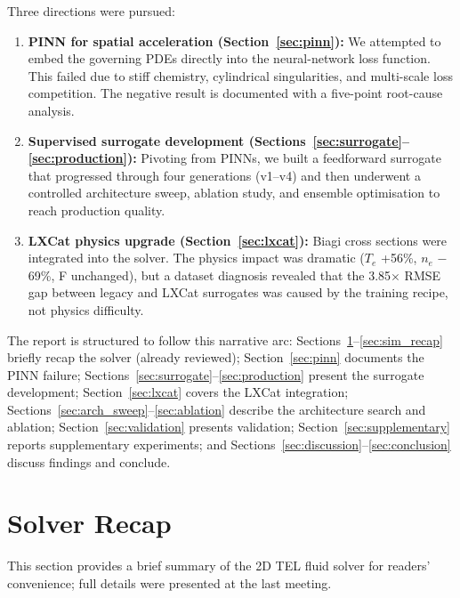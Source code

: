 \documentclass[12pt,a4paper]{article}
\begin{document}
Three directions were pursued:
\begin{enumerate}
  \item \textbf{PINN for spatial acceleration
        (Section~\ref{sec:pinn}):} We attempted to embed the governing
        PDEs directly into the neural-network loss function.  This
        failed due to stiff chemistry, cylindrical singularities, and
        multi-scale loss competition.  The negative result is
        documented with a five-point root-cause analysis.
  \item \textbf{Supervised surrogate development
        (Sections~\ref{sec:surrogate}--\ref{sec:production}):}
        Pivoting from PINNs, we built a feedforward surrogate that
        progressed through four generations (v1--v4) and then underwent
        a controlled architecture sweep, ablation study, and ensemble
        optimisation to reach production quality.
  \item \textbf{LXCat physics upgrade
        (Section~\ref{sec:lxcat}):} Biagi cross sections were
        integrated into the solver.  The physics impact was dramatic
        ($T_e$ +56\%, $n_e$ $-$69\%, F unchanged), but a dataset
        diagnosis revealed that the 3.85$\times$ RMSE gap between
        legacy and LXCat surrogates was caused by the training recipe,
        not physics difficulty.
\end{enumerate}

The report is structured to follow this narrative arc:
Sections~\ref{sec:recap}--\ref{sec:sim_recap} briefly recap the
solver (already reviewed); Section~\ref{sec:pinn} documents the PINN
failure; Sections~\ref{sec:surrogate}--\ref{sec:production} present
the surrogate development; Section~\ref{sec:lxcat} covers the LXCat
integration; Sections~\ref{sec:arch_sweep}--\ref{sec:ablation}
describe the architecture search and ablation;
Section~\ref{sec:validation} presents validation;
Section~\ref{sec:supplementary} reports supplementary experiments; and
Sections~\ref{sec:discussion}--\ref{sec:conclusion} discuss findings
and conclude.

\section{Solver Recap}
\label{sec:recap}

This section provides a brief summary of the 2D TEL fluid solver for
readers' convenience; full details were presented at the last meeting.
\end{document}
